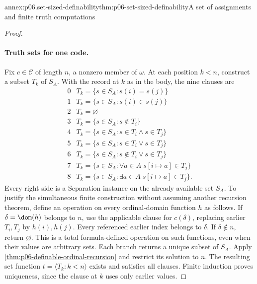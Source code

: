 \begin{annexitem}{annex:p06.set-sized-definability}{thm:p06-set-sized-definability}{A set of assignments and finite truth computations}
\begin{proof}
\paragraph{Truth sets for one code.}
Fix \(c\in\mathcal C\) of length \(n\), a nonzero member of
\(\omega\).  At each position \(k<n\), construct a subset
\(T_k\) of \(S_A\).  With the record at \(k\) as in the body,
the nine clauses are
\[
\begin{array}{c|l}
0&T_k=\{s\in S_A:s(i)=s(j)\}\\
1&T_k=\{s\in S_A:s(i)\in s(j)\}\\
2&T_k=\varnothing\\
3&T_k=\{s\in S_A:s\notin T_i\}\\
4&T_k=\{s\in S_A:s\in T_i\land s\in T_j\}\\
5&T_k=\{s\in S_A:s\in T_i\lor s\in T_j\}\\
6&T_k=\{s\in S_A:s\notin T_i\lor s\in T_j\}\\
7&T_k=\{s\in S_A:\forall a\in A\;
                         s[i\mapsto a]\in T_j\}\\
8&T_k=\{s\in S_A:\exists a\in A\;
                         s[i\mapsto a]\in T_j\}.
\end{array}
\]
Every right side is a Separation instance on the already available
set \(S_A\).  To justify the simultaneous finite construction
without assuming another recursion theorem, define an operation
on every ordinal-domain function \(h\) as follows.  If
\(\delta=\dom(h)\) belongs to \(n\), use the applicable clause
for \(c(\delta)\), replacing earlier \(T_i,T_j\) by
\(h(i),h(j)\).  Every referenced earlier index belongs to
\(\delta\).  If \(\delta\notin n\), return \(\varnothing\).
This is a total formula-defined operation on such functions,
even when their values are arbitrary sets.  Each branch returns
a unique subset of \(S_A\).
Apply \cref{thm:p06-definable-ordinal-recursion} and restrict its
solution to \(n\).  The resulting set function
\(t=\langle T_k:k<n\rangle\) exists and satisfies all clauses.
Finite induction proves uniqueness, since the clause at \(k\)
uses only earlier values.


\end{proof}
\end{annexitem}
